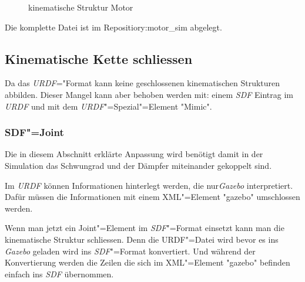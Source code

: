 \begin{figure}[ht!]
	\centering
{}
	\caption{kinematische Struktur Motor}
	\label{Ab:motor-struktur}
\end{figure}

Die komplette Datei ist im Repositiory:motor\_sim abgelegt.


\subsection{Kinematische Kette schliessen}
Da das \textit{URDF}="Format kann keine geschlossenen kinematischen Strukturen abbilden.
Dieser Mangel kann aber behoben werden mit: einem \textit{SDF} Eintrag im \textit{URDF} und mit dem \textit{URDF}"=Spezial"=Element \textsc{"}Mimic\textsc{"}.

\subsubsection{SDF"=Joint}
Die in diesem Abschnitt erklärte Anpassung wird benötigt damit in der Simulation das Schwungrad und der Dämpfer miteinander gekoppelt sind.

Im \textit{URDF} können Informationen hinterlegt werden, die nur\textit{Gazebo} interpretiert.
Dafür müssen die Informationen mit einem XML"=Element \textsc{"}gazebo\textsc{"} umschlossen werden.

Wenn man jetzt ein Joint"=Element im \textit{SDF}"=Format einsetzt kann man die kinematische Struktur schliessen.
Denn die {URDF}"=Datei wird bevor es ins \textit{Gazebo} geladen wird ins \textit{SDF}"=Format konvertiert.
Und während der Konvertierung werden die Zeilen die sich im XML"=Element \textsc{"}gazebo\textsc{"} befinden einfach ins \textit{SDF} übernommen.

